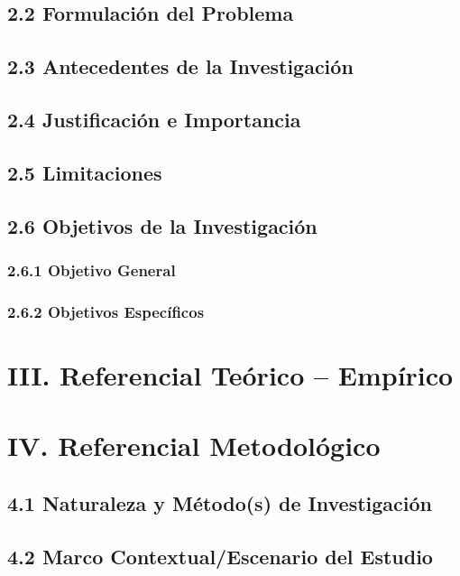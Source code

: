 \documentclass[12pt]{../componentes/uns}
\begin{document}
\subsection*{2.2 Formulación del Problema}
\lipsum[3]

\subsection*{2.3 Antecedentes de la Investigación}
\lipsum[4]

\subsection*{2.4 Justificación e Importancia}
\lipsum[5]

\subsection*{2.5 Limitaciones}
\lipsum[6]

\subsection*{2.6 Objetivos de la Investigación}
\subsubsection*{2.6.1 Objetivo General}
\lipsum[7]

\subsubsection*{2.6.2 Objetivos Específicos}
\lipsum[8]

\section*{III. Referencial Teórico – Empírico}
\lipsum[9]

\section*{IV. Referencial Metodológico}

\subsection*{4.1 Naturaleza y Método(s) de Investigación}
\lipsum[10]

\subsection*{4.2 Marco Contextual/Escenario del Estudio}
\lipsum[11]
\end{document}
